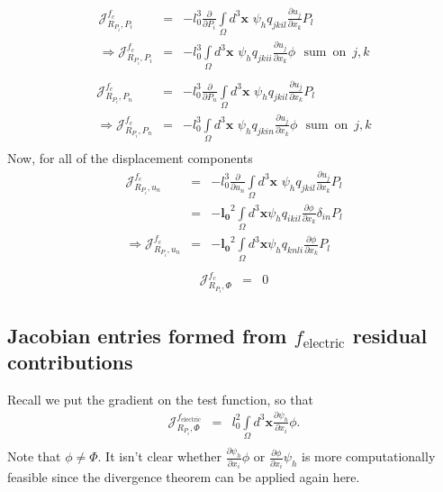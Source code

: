 \documentclass[16pt]{article} %
\begin{document}
\begin{eqnarray}\nonumber
\mathscr{J}_{R_{P_i}, P_i}^{f_c} &=& - l_0^3 \frac{\partial}{\partial P_i} \int\limits_\Omega  d^3 {\boldsymbol x} \,\, \psi_h q_{jkil} \frac{\partial u_j}{\partial x_k} P_l \\ \nonumber
\Rightarrow \mathscr{J}_{R_{P_i}, P_i}^{f_c} &=&- l_0^3 \int\limits_\Omega  d^3 {\boldsymbol x} \,\, \psi_h q_{jkii} \frac{\partial u_j}{\partial x_k} \phi \,\,\,\,\mathrm{sum}\,\,\,\mathrm{on}\,\,\, j,k\\ \nonumber
\end{eqnarray}
\begin{eqnarray}\nonumber
\mathscr{J}_{R_{P_i}, P_n}^{f_c} &=& - l_0^3 \frac{\partial}{\partial P_n} \int\limits_\Omega  d^3 {\boldsymbol x} \,\, \psi_h q_{jkil} \frac{\partial u_j}{\partial x_k} P_l \\ \nonumber
\Rightarrow \mathscr{J}_{R_{P_i}, P_n}^{f_c} &=&- l_0^3  \int\limits_\Omega  d^3 {\boldsymbol x} \,\, \psi_h q_{jkin} \frac{\partial u_j}{\partial x_k} \phi \,\,\,\,\mathrm{sum}\,\,\,\mathrm{on}\,\,\, j,k\\ \nonumber
\end{eqnarray}
Now, for all of the displacement components
\begin{eqnarray}\nonumber
\mathscr{J}_{R_{P_i}, u_n}^{f_c} &=&- l_0^3 \frac{\partial}{\partial u_n}\int\limits_\Omega  d^3 {\boldsymbol x} \,\, \psi_h q_{jkil} \frac{\partial u_j}{\partial x_k} P_l \\ \nonumber
&=& - \mathbf{l_0}^2 \int\limits_\Omega d^3 {\boldsymbol x} \psi_h q_{ikil} \frac{\partial \phi}{\partial x_k} \delta_{in} P_l \\ \nonumber
\Rightarrow \mathscr{J}_{R_{P_i}, u_n}^{f_c} &=& - \mathbf{l_0}^2 \int\limits_\Omega d^3 {\boldsymbol x} \psi_h q_{knli} \frac{\partial \phi}{\partial x_k} P_l \\ \nonumber %
\end{eqnarray}
\begin{eqnarray}\nonumber
\mathscr{J}_{R_{P_i}, \Phi}^{f_c} &=& 0
\end{eqnarray}

\subsection{Jacobian entries formed from $f_\mathrm{electric}$ residual contributions}

Recall we put the gradient on the test function, so that
\begin{eqnarray}\nonumber
\mathscr{J}_{R_{P_i}, \Phi}^{f_\mathrm{electric}} &=& l_0^2 \int\limits_\Omega d^3 {\boldsymbol x}\frac{\partial \psi_h}{\partial x_i} \phi. \\ \nonumber
\end{eqnarray}
Note that $\phi \neq \Phi$. It isn't clear whether $\frac{\partial \psi_h}{\partial x_i} \phi$ or $\frac{\partial \phi}{\partial x_i} \psi_h$ is more computationally feasible since the divergence theorem can be applied again here.
\end{document}
